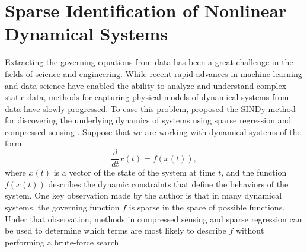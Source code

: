 \section{Sparse Identification of Nonlinear Dynamical Systems}

Extracting the governing equations from data has been a great challenge in the fields of science and engineering.
While recent rapid advances in machine learning and data science have enabled the ability to analyze and understand complex static data, methods for capturing physical models of dynamical systems from data have slowly progressed.
To ease this problem, \citeauthor{bruntonDiscoveringGoverningEquations2016} proposed the \gls{SINDy} method for discovering the underlying dynamics of systems using sparse regression and compressed sensing \cite{bruntonDiscoveringGoverningEquations2016}.
Suppose that we are working with dynamical systems of the form
\begin{equation*}
    \frac{d}{dt} x(t) = f(x(t)),
\end{equation*}
where $x(t)$ is a vector of the state of the system at time $t$, and the function $f(x(t))$ describes the dynamic constraints that define the behaviors of the system.
One key observation made by the author is that in many dynamical systems, the governing function $f$ is sparse in the space of possible functions.
Under that observation, methods in compressed sensing and sparse regression can be used to determine which terms are most likely to describe $f$ without performing a brute-force search.

